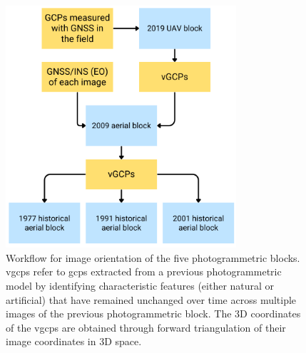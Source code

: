\begin{figure}
    \centering
    \includegraphics[height=9cm]{histo_datasets_workflow}
    \caption{Workflow for image orientation of the five photogrammetric blocks. \acp{vgcp} refer to \acp{gcp} extracted from a previous photogrammetric model by identifying characteristic features (either natural or artificial) that have remained unchanged over time across multiple images of the previous photogrammetric block. The 3D coordinates of the \acp{vgcp} are obtained through forward triangulation of their image coordinates in 3D space.}
    \label{fig:2:workflow}
\end{figure}

